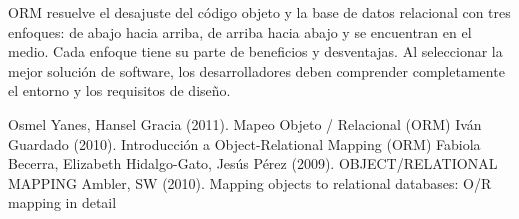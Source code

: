 \documentclass[twoside,twocolumn]{article}
\begin{document}
ORM resuelve el desajuste del código objeto y la base de datos relacional con tres enfoques: de abajo hacia arriba, de arriba hacia abajo y se encuentran en el medio. Cada enfoque tiene su parte de beneficios y desventajas. Al seleccionar la mejor solución de software, los desarrolladores deben comprender completamente el entorno y los requisitos de diseño.





\begin{thebibliography}{99} %
Osmel Yanes, Hansel Gracia (2011).
\newblock Mapeo Objeto / Relacional (ORM)
Iván Guardado (2010).
\newblock  Introducción a Object-Relational Mapping (ORM)
Fabiola Becerra, Elizabeth Hidalgo-Gato, Jesús Pérez (2009).
\newblock  OBJECT/RELATIONAL MAPPING
Ambler, SW (2010).
\newblock  Mapping objects to relational databases: O/R mapping in detail
 
 
\end{thebibliography}

\end{document}
